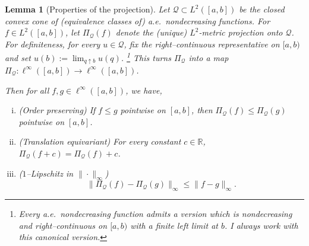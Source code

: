 \documentclass[12pt]{article}
\newtheorem{lemma}{Lemma}
\begin{document}
\begin{lemma}[Properties of the projection] \label{lem:projection_properties}
Let $\mathcal Q\subset L^2([a,b])$ be the closed convex cone of (equivalence classes of) a.e.\ nondecreasing functions.
For $f\in L^2([a,b])$, let $\Pi_{\mathcal Q}(f)$ denote the (unique) $L^2$-metric projection onto $\mathcal Q$.
For definiteness, for every $u\in\mathcal Q$, fix the right–continuous representative on $[a,b)$ and set $u(b):=\lim_{q\uparrow b}u(q)$.%
\footnote{Every a.e.\ nondecreasing function admits a version which is nondecreasing and right–continuous on $[a,b)$ with a finite left limit at $b$. I always work with this canonical version.}
This turns $\Pi_{\mathcal Q}$ into a map $\Pi_{\mathcal Q}:\ell^\infty([a,b])\to\ell^\infty([a,b])$.

Then for all $f,g\in\ell^\infty([a,b])$, we have,
\begin{enumerate}[(i)]
\item (\emph{Order preserving}) If $f\le g$ pointwise on $[a,b]$, then $\Pi_{\mathcal Q}(f)\le \Pi_{\mathcal Q}(g)$ pointwise on $[a,b]$.
\item (\emph{Translation equivariant}) For every constant $c\in\mathbb R$, $\Pi_{\mathcal Q}(f+c)=\Pi_{\mathcal Q}(f)+c$.
\item (\emph{$1$–Lipschitz in $\|\cdot\|_\infty$}) 
\[
\|\Pi_{\mathcal Q}(f)-\Pi_{\mathcal Q}(g)\|_\infty\le \|f-g\|_\infty.
\]
\end{enumerate}
\end{lemma}
\end{document}
